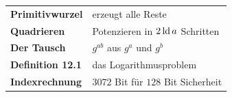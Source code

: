 \begin{merksatz}
\begin{center}
\renewcommand{\arraystretch}{1.5}
\begin{tabular}{@{}P{3.0cm}P{5.6cm}@{}}
\toprule
\textbf{Primitivwurzel} & erzeugt alle Reste\\
\textbf{Quadrieren} & Potenzieren in $2\operatorname{ld} a$ Schritten\\
\textbf{Der Tausch} & $g^{ab}$ aus $g^{a}$ und $g^{b}$\\
\textbf{Definition 12.1} & das Logarithmusproblem\\
\textbf{Indexrechnung} & $3072$ Bit für $128$ Bit Sicherheit\\
\bottomrule
\end{tabular}
\end{center}

\begin{center}
\begin{minipage}{0.88\textwidth}
\end{minipage}
\end{center}
\end{merksatz}
